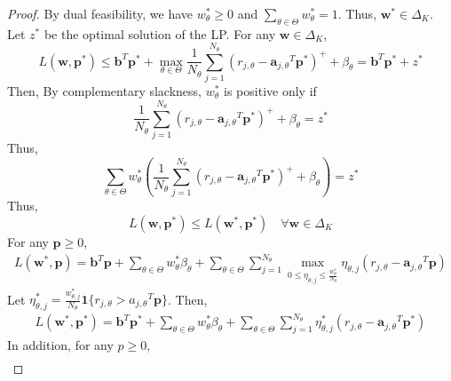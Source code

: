 \documentclass[11pt]{article}
\newcommand{\bb}{\mathbf{b}}
\newcommand{\ba}{\mathbf{a}}
\newcommand{\bp}{\mathbf{p}}
\newcommand{\bw}{\mathbf{w}}
\begin{document}
\begin{proof}
    By dual feasibility, we have $w^*_{\theta}\geq 0$ and $\sum_{\theta\in\Theta}w^*_{\theta}=1$. Thus, $\bw^*\in\Delta_K$. Let $z^*$ be the optimal solution of the LP. For any $\bw\in\Delta_K$,
    \begin{equation*}
        L(\bw,\bp^*)\leq \bb^T\bp^* + \max_{\theta\in\Theta}\frac{1}{N_{\theta}}\sum_{j=1}^{N_{\theta}}(r_{j,\theta}-{\ba_{j,\theta}}^T\bp^*)^++\beta_{\theta}  = \bb^T\bp^* + z^*
    \end{equation*}
    Then,  By complementary slackness, $w^*_{\theta}$ is positive only if
    \begin{equation*}
        \frac{1}{N_{\theta}}\sum_{j=1}^{N_{\theta}}(r_{j,\theta}-{\ba_{j,\theta}}^T\bp^*)^++\beta_{\theta} = z^*
    \end{equation*}
    Thus, 
    \begin{equation*}
        \sum_{\theta\in\Theta} w^*_{\theta}\left(\frac{1}{N_{\theta}}\sum_{j=1}^{N_{\theta}}(r_{j,\theta}-{\ba_{j,\theta}}^T\bp^*)^++\beta_{\theta}\right) = z^*
    \end{equation*}
    Thus,
    \begin{equation}\label{eqn: LP_Saddle_Point_1}
        L(\bw,\bp^*)\leq L(\bw^*,\bp^*)\quad\forall \bw\in\Delta_K
    \end{equation}
    For any $\bp\geq 0$, 
    \begin{equation*}
        \begin{aligned}
            L(\bw^*,\bp) = \bb^T\bp + \sum_{\theta\in\Theta}w^*_{\theta}\beta_{\theta}+ \sum_{\theta\in\Theta}\sum_{j=1}^{N_{\theta}}\max_{0\leq \eta_{\theta,j}\leq\frac{w^*_{\theta}}{N_{\theta}}}\eta_{\theta,j}(r_{j,\theta}-{\ba_{j,\theta}}^T\bp)
        \end{aligned}
    \end{equation*}
    Let $\eta^*_{\theta,j}=\frac{w^*_{\theta,j}}{N_{\theta}}\mathbf{1}\{r_{j,\theta}>{a_{j,\theta}}^T\bp\}$. Then,
    \begin{equation*}
        \begin{aligned}
            L(\bw^*,\bp^*) = \bb^T\bp^* + \sum_{\theta\in\Theta}w^*_{\theta}\beta_{\theta}+ \sum_{\theta\in\Theta}\sum_{j=1}^{N_{\theta}}\eta^*_{\theta,j}(r_{j,\theta}-{\ba_{j,\theta}}^T\bp^*)
        \end{aligned}
    \end{equation*}
    In addition, for any $p\geq 0$,
    \begin{equation*}
        \begin{aligned}

\end{aligned}
\end{equation*}
\end{proof}
\end{document}
